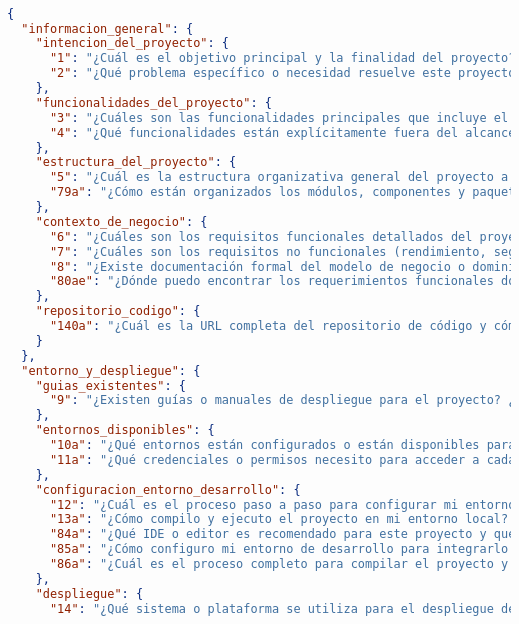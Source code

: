 \begin{lstlisting}[language=json, caption={Listado de elicitación de preguntas procesadas y clasificadas}, label={listado:preguntas}]

{
  "informacion_general": {
    "intencion_del_proyecto": {
      "1": "¿Cuál es el objetivo principal y la finalidad del proyecto?",
      "2": "¿Qué problema específico o necesidad resuelve este proyecto?"
    },
    "funcionalidades_del_proyecto": {
      "3": "¿Cuáles son las funcionalidades principales que incluye el proyecto?",
      "4": "¿Qué funcionalidades están explícitamente fuera del alcance del proyecto?"
    },
    "estructura_del_proyecto": {
      "5": "¿Cuál es la estructura organizativa general del proyecto a nivel de repositorios o subproyectos?",
      "79a": "¿Cómo están organizados los módulos, componentes y paquetes dentro del proyecto?"
    },
    "contexto_de_negocio": {
      "6": "¿Cuáles son los requisitos funcionales detallados del proyecto?",
      "7": "¿Cuáles son los requisitos no funcionales (rendimiento, seguridad, escalabilidad, etc.) del proyecto?",
      "8": "¿Existe documentación formal del modelo de negocio o dominio? ¿Dónde se encuentra?",
      "80ae": "¿Dónde puedo encontrar los requerimientos funcionales documentados para entender el problema a resolver?"
    },
    "repositorio_codigo": {
      "140a": "¿Cuál es la URL completa del repositorio de código y cómo puedo acceder a él?"
    }
  },
  "entorno_y_despliegue": {
    "guias_existentes": {
      "9": "¿Existen guías o manuales de despliegue para el proyecto? ¿Dónde puedo encontrarlas?"
    },
    "entornos_disponibles": {
      "10a": "¿Qué entornos están configurados o están disponibles para el proyecto (desarrollo, pruebas, preproducción, producción, etc.)?",
      "11a": "¿Qué credenciales o permisos necesito para acceder a cada entorno (VPN, usuarios, certificados, etc.)?"
    },
    "configuracion_entorno_desarrollo": {
      "12": "¿Cuál es el proceso paso a paso para configurar mi entorno de desarrollo local (IDE, herramientas, plugins)?",
      "13a": "¿Cómo compilo y ejecuto el proyecto en mi entorno local? ¿Qué comandos debo utilizar?",
      "84a": "¿Qué IDE o editor es recomendado para este proyecto y qué configuraciones específicas requiere?",
      "85a": "¿Cómo configuro mi entorno de desarrollo para integrarlo con los sistemas corporativos?",
      "86a": "¿Cuál es el proceso completo para compilar el proyecto y verificar que funciona correctamente?"
    },
    "despliegue": {
      "14": "¿Qué sistema o plataforma se utiliza para el despliegue de aplicaciones?",

\end{lstlisting}
